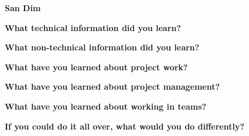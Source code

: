 \documentclass[onecolumn, draftclsnofoot,10pt, compsoc]{IEEEtran}
\begin{document}
\begin{flushleft}
{\large\textbf{San Dim}\par}
\textbf{What technical information did you learn?}\par

\textbf{What non-technical information did you learn?}\par

\textbf{What have you learned about project work?}\par

\textbf{What have you learned about project management?}\par

\textbf{What have you learned about working in teams?}\par

\textbf{If you could do it all over, what would you do differently?}\par

\end{flushleft}
\end{document}
